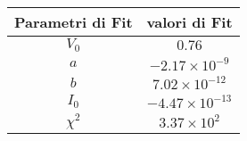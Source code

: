 \begin{tabular}{cc}
\hline
	Parametri di Fit & valori di Fit\\ 
\hline
	$V_0$ & $0.76$ \\
	$a$ & $-2.17\times 10^{-9}$ \\
	$b$ & $7.02\times 10^{-12}$ \\
	$I_0$ & $-4.47\times 10^{-13}$ \\
	$\chi^2$ & $3.37\times 10^{2}$ \\
\hline
\end{tabular}
